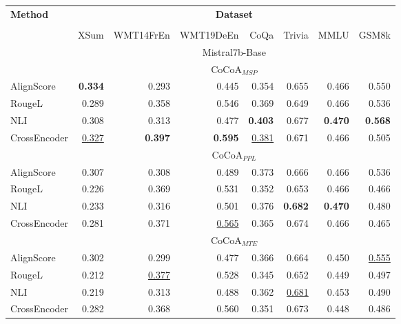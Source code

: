 
\begin{table*}[th!]
\footnotesize
\centering

\begin{tabular}{lrrrrrrr}
\toprule
    \multirow{2}{*}{\textbf{Method}}  & \multicolumn{7}{c}{\textbf{Dataset}}  \\ 
      \cmidrule(lr){2-8}  \\
  & XSum & WMT14FrEn & WMT19DeEn & CoQa & Trivia & MMLU & GSM8k \\
  \midrule

\rowcolor[gray]{0.9} & \multicolumn{7}{c}{Mistral7b-Base} \\

\midrule

& \multicolumn{7}{c}{$\text{CoCoA}_{MSP}$}\\
\midrule

AlignScore & \textbf{0.334}& 0.293& 0.445& 0.354& 0.655& 0.466& 0.550\\
RougeL & 0.289& 0.358& 0.546& 0.369& 0.649& 0.466& 0.536\\
NLI & 0.308& 0.313& 0.477& \textbf{0.403}& 0.677& \textbf{0.470}& \textbf{0.568}\\
CrossEncoder & \underline{0.327}& \textbf{0.397}& \textbf{0.595}& \underline{0.381}& 0.671& 0.466& 0.505\\

\midrule

& \multicolumn{7}{c}{$\text{CoCoA}_{PPL}$}\\
\midrule

AlignScore & 0.307& 0.308& 0.489& 0.373& 0.666& 0.466& 0.536\\
RougeL & 0.226& 0.369& 0.531& 0.352& 0.653& 0.466& 0.466\\
NLI & 0.233& 0.316& 0.501& 0.376& \textbf{0.682}& \textbf{0.470}& 0.480\\
CrossEncoder & 0.281& 0.371& \underline{0.565}& 0.365& 0.674& 0.466& 0.465\\

\midrule

& \multicolumn{7}{c}{$\text{CoCoA}_{MTE}$}\\
\midrule

AlignScore & 0.302& 0.299& 0.477& 0.366& 0.664& 0.450& \underline{0.555}\\
RougeL & 0.212& \underline{0.377}& 0.528& 0.345& 0.652& 0.449& 0.497\\
NLI & 0.219& 0.313& 0.488& 0.362& \underline{0.681}& 0.453& 0.490\\
CrossEncoder & 0.282& 0.368& 0.560& 0.351& 0.673& 0.448& 0.486\\
\midrule


\end{tabular}
\end{table*}
